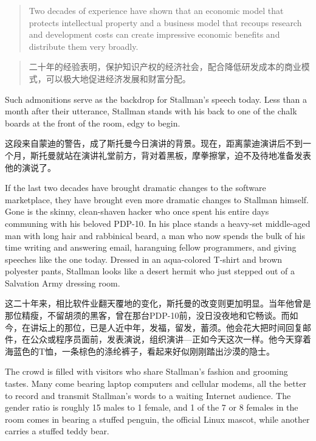 \ifdefined\eng
\begin{quote}
Two decades of experience have shown that an economic model that protects intellectual property and a business model that recoups research and development costs can create impressive economic benefits and distribute them very broadly.
\end{quote}
\fi

\ifdefined\chs
\begin{quote}
二十年的经验表明，保护知识产权的经济社会，配合降低研发成本的商业模式，可以极大地促进经济发展和财富分配。
\end{quote}

\fi

\ifdefined\eng
Such admonitions serve as the backdrop for Stallman's speech today. Less than a month after their utterance, Stallman stands with his back to one of the chalk boards at the front of the room, edgy to begin.
\fi

\ifdefined\chs
这段来自蒙迪的警告，成了斯托曼今日演讲的背景。现在，距离蒙迪演讲后不到一个月，斯托曼就站在演讲礼堂前方，背对着黑板，摩拳擦掌，迫不及待地准备发表他的演说了。
\fi

\ifdefined\eng
If the last two decades have brought dramatic changes to the software marketplace, they have brought even more dramatic changes to Stallman himself. Gone is the skinny, clean-shaven hacker who once spent his entire days communing with his beloved PDP-10. In his place stands a heavy-set middle-aged man with long hair and rabbinical beard, a man who now spends the bulk of his time writing and answering email, haranguing fellow programmers, and giving speeches like the one today. Dressed in an aqua-colored T-shirt and brown polyester pants, Stallman looks like a desert hermit who just stepped out of a Salvation Army dressing room.
\fi

\ifdefined\chs
这二十年来，相比软件业翻天覆地的变化，斯托曼的改变则更加明显。当年他曾是那位精瘦，不留胡须的黑客，曾在那台PDP-10前，没日没夜地和它畅谈。而如今，在讲坛上的那位，已是人近中年，发福，留发，蓄须。他会花大把时间回复邮件，在公众或程序员面前，发表演说，组织演讲---正如今天这次一样。他今天穿着海蓝色的T恤，一条棕色的涤纶裤子，看起来好似刚刚踏出沙漠的隐士。
\fi

\ifdefined\eng
The crowd is filled with visitors who share Stallman's fashion and grooming tastes. Many come bearing laptop computers and cellular modems, all the better to record and transmit Stallman's words to a waiting Internet audience. The gender ratio is roughly 15 males to 1 female, and 1 of the 7 or 8 females in the room comes in bearing a stuffed penguin, the official Linux mascot, while another carries a stuffed teddy bear.
\fi

